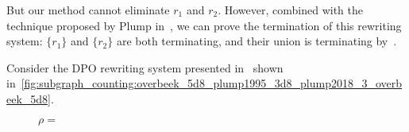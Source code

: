 \begin{example}
But our method cannot eliminate $r_1$ and $r_2$. However, combined with the technique proposed by Plump in~\cite{plump2018modular}, we can prove the termination of this rewriting system: $\{r_1\}$ and $\{r_2\}$ are both terminating, and their union is terminating by~\cite{plump2018modular}.
\end{example}


\begin{example}
  \label{ex:overbeek_5d8_plump1995_3d8_plump2018_3_overbeek_5d8}
  Consider the DPO rewriting system presented in~\cite[Example 3.8]{plump1995ontermination} shown in~\autoref{fig:subgraph_counting:overbeek_5d8_plump1995_3d8_plump2018_3_overbeek_5d8}.

  \begin{figure}[H]
    \centering
\begin{center}
 $\rho = ${ 
 }
\end{center}


\end{figure}
\end{example}
